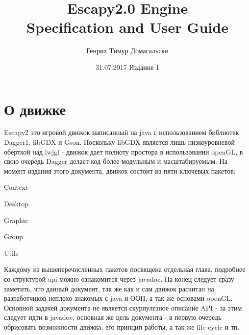 \documentclass[11pt]{report}
\title{
	\textbf{Escapy2.0 Engine\\Specification and User Guide}
}
\author{Генрих Тимур Домагальски}
\date{31.07.2017 Издаине 1}
\newenvironment{enumerate*}%
  {\begin{enumerate}%
    \setlength{\itemsep}{2pt}%
    \setlength{\parskip}{0.75pt}}%
  {\end{enumerate}}
\begin{document}
\maketitle

\tableofcontents

\newpage

\chapter*{О движке}
Escapy2 это игровой движок написанный на java с использованием библиотек Dagger1, libGDX и Gson. Поскольку libGDX является лишь низкоуровневой оберткой над lwjgl - движок дает полноту простора в использовании openGL, в свою очередь Dagger делает код более модульным и масштабируемым. На момент издания этого документа, движок состоит из пяти ключевых пакетов: \begin{enumerate*}
	\item Context
	\item Desktop
	\item Graphic
	\item Group
	\item Utils
\end{enumerate*}
Каждому из вышеперечисленных пакетов посвящена отдельная глава, подробнее со структурой api можно ознакомится через javadoc. На конец следует сразу заметить, что данный документ, так же как и сам движок расчитан на разработчиков неплохо знакомых с java и ООП, а так же основами openGL. Основной задачей документа не является скурпулезное описание API - за этим следует идти в javadoc, основная же цель документа - в первую очередь обрисовать возможности движка, его принцип работы, а так же life-cycle и тп.
\end{document}

